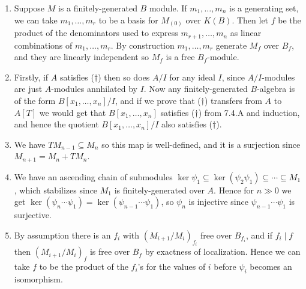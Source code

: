 \documentclass{report}
\newcommand{\divides}{\mathrel{\mid}} %
\begin{document}
\begin{enumerate}[label=\textbf{7.4.\Alph*.}]
	\item Suppose $M$ is a finitely-generated $B$ module. If $m_1,\ldots,m_n$
	      is a generating set, we can take $m_1,\ldots,m_r$ to be a basis
	      for $M_{(0)}$ over $K(B)$. Then let $f$ be the product of the
	      denominators used to express $m_{r+1},\ldots,m_n$ as linear
	      combinations of $m_1,\ldots,m_r$. By construction $m_1,\ldots,m_r$
	      generate $M_f$ over $B_f$, and they are linearly independent so $M_f$
	      is a free $B_f$-module.

	\item Firstly, if $A$  satisfies ($\dagger$) then so does $A/I$ for any
	      ideal $I$, since $A/I$-modules are just $A$-modules annhilated by $I$.
	      Now any finitely-generated $B$-algebra is of the form
	      $B[x_1,\ldots,x_n]/I$, and if we prove that ($\dagger$) transfers from
	      $A$ to $A[T]$ we would get that $B[x_1,\ldots,x_n]$ satisfies
	      ($\dagger$) from 7.4.A and induction, and hence the quotient
	      $B[x_1,\ldots,x_n]/I$ also satisfies ($\dagger$).

	\item We have $TM_{n-1}\subseteq M_n$ so this map is well-defined, and it
	      is a surjection since $M_{n+1}=M_n+TM_n$.

	\item We have an ascending chain of submodules
	      $\ker\psi_1\subseteq\ker(\psi_2\psi_1)\subseteq\cdots\subseteq M_1$,
	      which stabilizes since $M_1$ is finitely-generated over $A$. Hence for
	      $n\gg0$ we get $\ker(\psi_n\cdots\psi_1)=\ker(\psi_{n-1}\cdots\psi_1)$,
	      so $\psi_n$ is injective since $\psi_{n-1}\cdots\psi_1$ is surjective.

	\item By assumption there is an $f_i$ with $(M_{i+1}/M_i)_{f_i}$ free over
	      $B_{f_i}$, and if $f_i\divides f$ then $(M_{i+1}/M_i)_f$ is free over
	      $B_f$ by exactness of localization. Hence we can take $f$ to be the
	      product of the $f_i$'s for the values of $i$ before $\psi_i$ becomes
	      an isomorphism.


\end{enumerate}
\end{document}
